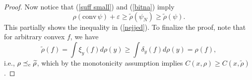 \documentclass[10pt,a4paper]{amsart}
\newcommand{\conv}{\mathrm{conv}\,}
\newcommand{\lc}{\preceq_{\textnormal{c}}}
\begin{document}
\begin{proof}
Now notice that (\ref{suff small}) and (\ref{bitna}) imply
\begin{equation} \label{bistna}
       \rho(\conv{\psi})+\varepsilon\geq \widetilde{\rho}(\psi_N)\geq\widetilde{\rho}(\psi).
   \end{equation}
This partially shows the inequality in (\ref{nejjed}). To finalize the proof, note that for arbitrary convex $f$, we have
$$\widetilde{\rho}(f)=\int \xi_y(f)d\rho(y)\geq\int \delta_y(f)d\rho(y)=\rho(f),$$
i.e., $\rho\lc\widetilde{\rho}$, which by the monotonicity assumption implies $C(x,\rho)\geq C(x,\widetilde{\rho})$.
\end{proof}
\end{document}
